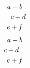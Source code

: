 \documentclass{article}
\begin{document}
\begin{multline}
a+b\\
\shoveleft{c+d}\\
e+f
\end{multline}
\begin{multline}
a+b\\
\shoveright{c+d}\\
e+f
\end{multline}
\end{document}
